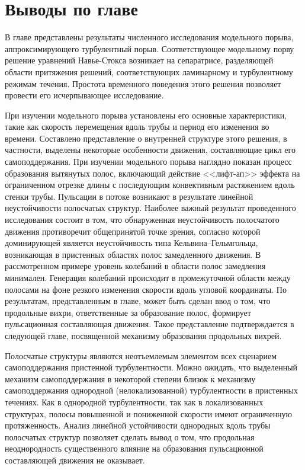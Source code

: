 \section{Выводы по главе}

В главе представлены результаты численного исследования модельного порыва, аппроксимирующего турбулентный порыв. Соответствующее модельному порву решение уравнений Навье-Стокса возникает на сепаратрисе, разделяющей области притяжения решений, соответствующих ламинарному и турбулентному режимам течения. Простота временного поведения этого решения позволяет провести его исчерпывающее исследование. 

При изучении модельного порыва установлены его основные характеристики, такие как скорость перемещения вдоль трубы и период его изменения во времени. Составлено представление о внутренней структуре этого решения, в частности, выделены некоторые особенности движения, составляющие цикл его самоподдержания. При изучении модельного порыва наглядно показан процесс образования вытянутых полос, включающий действие <<лифт-ап>> эффекта на ограниченном отрезке длины с последующим конвективным растяжением вдоль стенки трубы. Пульсации в потоке возникают в результате линейной неустойчивости полосчатых структур. Наиболее важный результат проведенного исследования состоит в том, что обнаруженная неустойчивость полосчатого движения противоречит общепринятой точке зрения, согласно которой доминирующей является неустойчивость типа Кельвина--Гельмгольца, возникающая в пристенных областях полос замедленного движения. В рассмотренном примере уровень колебаний в области полос замедления минимален. Генерация колебаний происходит в промежуточной области между полосами на фоне резкого изменения скорости вдоль угловой координаты. По результатам, представленным в главе, может быть сделан ввод о том, что продольные вихри, ответственные за образование полос, формирует пульсационная составляющая движения. Такое представление подтверждается в следующей главе, посвященной механизму образования продольных вихрей.

Полосчатые структуры являются неотъемлемым элементом всех сценарием самоподдержания пристенной турбулентности. Можно ожидать, что выделенный механизм самоподдержания в некоторой степени близок к механизму самоподдержания однородной (нелокализованной) турбулентности в пристенных течениях. Как в однородной турбулентности, так как в локализованных структурах, полосы повышенной и пониженной скорости имеют ограниченную протяженность. Анализ линейной устойчивости однородных вдоль трубы полосчатых структур позволяет сделать вывод о том, что продольная неоднородность существенного влияние на образования пульсационной составляющей движения не оказывает.

